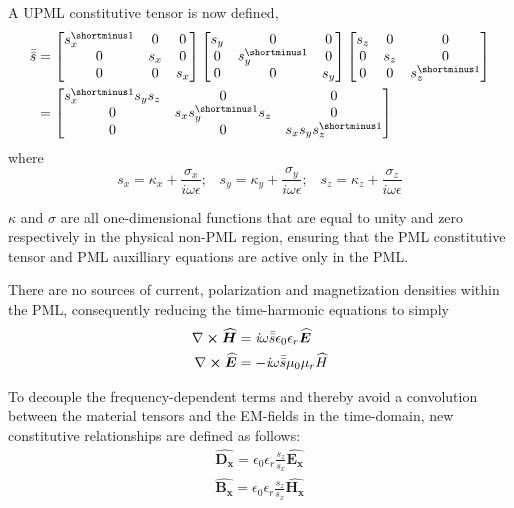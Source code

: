 \documentclass[]{article}
\begin{document}
		A UPML constitutive tensor is now defined,
		\begin{align}
			\bar{\bar{s}} &= \begin{bmatrix}s_{x}^{\shortminus 1} & 0 & 0 \\ 0 & s_{x} & 0 \\ 0 & 0 & s_{x}\end{bmatrix}\begin{bmatrix}s_{y} & 0 & 0 \\ 0 & s_{y}^{\shortminus 1} & 0 \\ 0 & 0 & s_{y}\end{bmatrix}\begin{bmatrix}s_{z} & 0 & 0 \\ 0 & s_{z} & 0 \\ 0 & 0 & s_{z}^{\shortminus 1}\end{bmatrix} \\
			&= \begin{bmatrix}s_{x}^{\shortminus 1}s_{y}s_{z} & 0 & 0 \\ 0 & s_{x}s_{y}^{\shortminus 1}s_{z} & 0 \\ 0 & 0 & s_{x}s_{y}s_{z}^{\shortminus 1}\end{bmatrix}
		\end{align}
		where 
		\begin{equation}
			s_{x} = \kappa_{x} + \frac{\sigma_{x}}{i\omega\epsilon};\;\;\; s_{y} = \kappa_{y} + \frac{\sigma_{y}}{i\omega\epsilon};\;\;\; s_{z} = \kappa_{z} + \frac{\sigma_{z}}{i\omega\epsilon}
		\end{equation}
		
		$\kappa$ and $\sigma$ are all one-dimensional functions that are equal to unity and zero respectively in the physical non-PML region, ensuring that the PML constitutive tensor and PML auxilliary equations are active only in the PML.
		
		There are no sources of current, polarization and magnetization densities within the PML, consequently reducing the time-harmonic equations to simply
		\begin{align}
			\nabla\cross\bm{\widehat{H}} &= \textit{i}\omega\bar{\bar{s}}\epsilon_{0}\epsilon_{r}\bm{\widehat{E}} \\
			\nabla\cross\bm{\widehat{E}} &= -\textit{i}\omega\bar{\bar{s}}\mu_{0}\mu_{r}\widehat{H}
		\end{align}
		
		To decouple the frequency-dependent terms and thereby avoid a convolution between the material tensors and the EM-fields in the time-domain, new constitutive relationships are defined as follows:
		\begin{align} \label{eq:const}
			\bm{\widehat{D_{x}}} = \epsilon_{0}\epsilon_{r}\frac{s_{z}}{s_{x}}\bm{\widehat{E_{x}}} \\
			\bm{\widehat{B_{x}}} = \epsilon_{0}\epsilon_{r}\frac{s_{z}}{s_{x}}\bm{\widehat{H_{x}}} \\
		\end{align}
		
\end{document}
